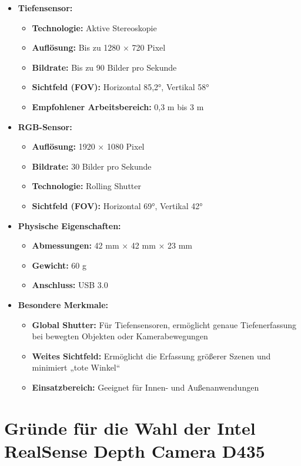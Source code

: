\documentclass[a4paper,12pt]{article}
\begin{document}
\begin{itemize}
    \item \textbf{Tiefensensor:}
    \begin{itemize}
        \item \textbf{Technologie:} Aktive Stereoskopie
        \item \textbf{Auflösung:} Bis zu 1280 × 720 Pixel
        \item \textbf{Bildrate:} Bis zu 90 Bilder pro Sekunde
        \item \textbf{Sichtfeld (FOV):} Horizontal 85,2°, Vertikal 58°
        \item \textbf{Empfohlener Arbeitsbereich:} 0,3 m bis 3 m
    \end{itemize}
    \item \textbf{RGB-Sensor:}
    \begin{itemize}
        \item \textbf{Auflösung:} 1920 × 1080 Pixel
        \item \textbf{Bildrate:} 30 Bilder pro Sekunde
        \item \textbf{Technologie:} Rolling Shutter
        \item \textbf{Sichtfeld (FOV):} Horizontal 69°, Vertikal 42°
    \end{itemize}
    \item \textbf{Physische Eigenschaften:}
    \begin{itemize}
        \item \textbf{Abmessungen:} 42 mm × 42 mm × 23 mm
        \item \textbf{Gewicht:} 60 g
        \item \textbf{Anschluss:} USB 3.0
    \end{itemize}
    \item \textbf{Besondere Merkmale:}
    \begin{itemize}
        \item \textbf{Global Shutter:} Für Tiefensensoren, ermöglicht genaue Tiefenerfassung bei bewegten 
        Objekten oder Kamerabewegungen
        \item \textbf{Weites Sichtfeld:} Ermöglicht die Erfassung größerer Szenen und minimiert „tote Winkel“
        \item \textbf{Einsatzbereich:} Geeignet für Innen- und Außenanwendungen
    \end{itemize}
\end{itemize}

\section*{Gründe für die Wahl der Intel RealSense Depth Camera D435}
\end{document}
